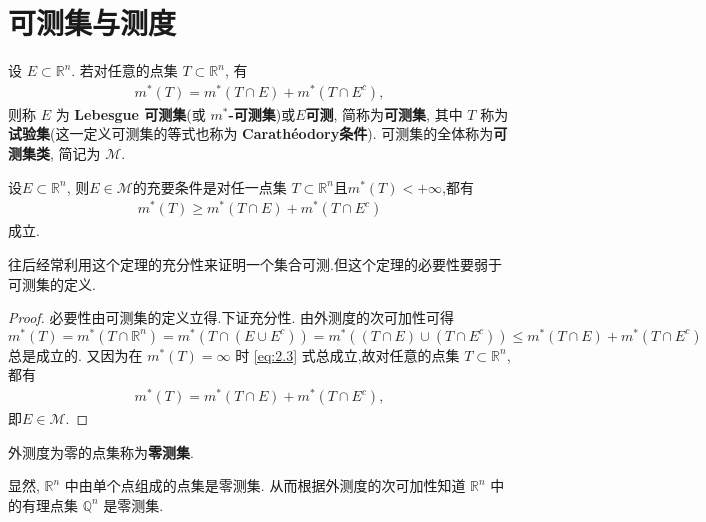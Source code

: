 \documentclass[../../main.tex]{subfiles}
\begin{document}
\section{可测集与测度}

\begin{definition}[可测集]
设 \(E \subset \mathbb{R}^n\). 若对任意的点集 \(T \subset \mathbb{R}^n\), 有
\begin{align*}
m^*(T)=m^*(T \cap E)+m^*(T \cap E^c), 
\end{align*}
则称 \(E\) 为 \textbf{Lebesgue 可测集}(或 \textbf{\(m^*\)-可测集})或$E$\textbf{可测}, 简称为\textbf{可测集}, 其中 \(T\) 称为\textbf{试验集}(这一定义可测集的等式也称为 \textbf{Carathéodory条件}). 可测集的全体称为\textbf{可测集类}, 简记为 \(\mathscr{M}\). 
\end{definition}

\begin{theorem}[集合可测的充要条件]\label{theorem:可测的充要条件}
设\(E\subset \mathbb{R}^n\), 则$E\in \mathscr{M}$的充要条件是对任一点集 \(T \subset \mathbb{R}^n\)且\(m^*(T)< + \infty\),都有
\begin{align}
m^*(T) \geqslant  m^*(T \cap E)+m^*(T \cap E^c) \label{eq:2.3}
\end{align}
成立. 
\end{theorem}
\begin{remark}
往后经常利用这个定理的充分性来证明一个集合可测.但这个定理的必要性要弱于可测集的定义.
\end{remark}
\begin{proof}
必要性由可测集的定义立得.下证充分性.
由外测度的次可加性可得
\[
m^*(T)=m^*\left( T\cap \mathbb{R} ^n \right) =m^*\left( T\cap \left( E\cup E^c \right) \right) =m^*\left( \left( T\cap E \right) \cup \left( T\cap E^c \right) \right)  \leqslant  m^*(T \cap E)+m^*(T \cap E^c)
\]
总是成立的. 又因为在 \(m^*(T)=\infty\) 时 \eqref{eq:2.3} 式总成立,故对任意的点集 \(T \subset \mathbb{R}^n\),都有
\begin{align*}
m^*(T)=m^*(T \cap E)+m^*(T \cap E^c), 
\end{align*}
即$E\in \mathscr{M}$.
\end{proof}

\begin{definition}[零测集]
外测度为零的点集称为\textbf{零测集}. 
\end{definition}
\begin{remark}
显然, \(\mathbb{R}^n\) 中由单个点组成的点集是零测集. 从而根据外测度的次可加性知道 \(\mathbb{R}^n\) 中的有理点集 \(\mathbb{Q}^n\) 是零测集.
\end{remark}
\end{document}
